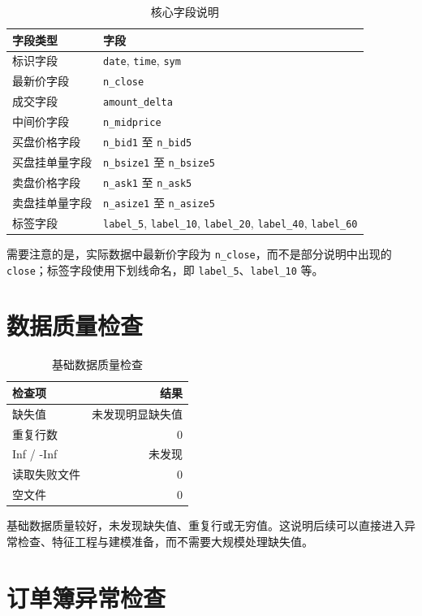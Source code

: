 \documentclass[UTF8,a4paper,12pt]{ctexart}
\begin{document}
\begin{table}[H]
\centering
\caption{核心字段说明}
\label{tab:fields}
\begin{tabular}{ll}
\toprule
字段类型 & 字段 \\
\midrule
标识字段 & \texttt{date}, \texttt{time}, \texttt{sym} \\
最新价字段 & \texttt{n\_close} \\
成交字段 & \texttt{amount\_delta} \\
中间价字段 & \texttt{n\_midprice} \\
买盘价格字段 & \texttt{n\_bid1} 至 \texttt{n\_bid5} \\
买盘挂单量字段 & \texttt{n\_bsize1} 至 \texttt{n\_bsize5} \\
卖盘价格字段 & \texttt{n\_ask1} 至 \texttt{n\_ask5} \\
卖盘挂单量字段 & \texttt{n\_asize1} 至 \texttt{n\_asize5} \\
标签字段 & \texttt{label\_5}, \texttt{label\_10}, \texttt{label\_20}, \texttt{label\_40}, \texttt{label\_60} \\
\bottomrule
\end{tabular}
\end{table}

需要注意的是，实际数据中最新价字段为 \texttt{n\_close}，而不是部分说明中出现的 \texttt{close}；标签字段使用下划线命名，即 \texttt{label\_5}、\texttt{label\_10} 等。

\section{数据质量检查}

\begin{table}[H]
\centering
\caption{基础数据质量检查}
\begin{tabular}{lr}
\toprule
检查项 & 结果 \\
\midrule
缺失值 & 未发现明显缺失值 \\
重复行数 & 0 \\
Inf / -Inf & 未发现 \\
读取失败文件 & 0 \\
空文件 & 0 \\
\bottomrule
\end{tabular}
\end{table}

基础数据质量较好，未发现缺失值、重复行或无穷值。这说明后续可以直接进入异常检查、特征工程与建模准备，而不需要大规模处理缺失值。

\section{订单簿异常检查}
\end{document}
